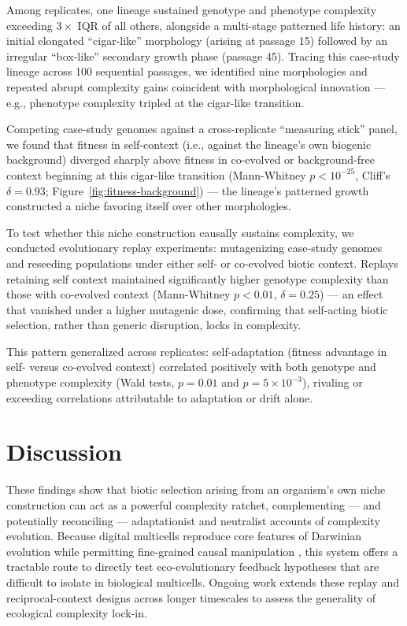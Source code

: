 Among replicates, one lineage sustained genotype and phenotype complexity exceeding $3\times$ IQR of all others, alongside a multi-stage patterned life history: an initial elongated ``cigar-like'' morphology (arising at passage 15) followed by an irregular ``box-like'' secondary growth phase (passage 45).
Tracing this case-study lineage across 100 sequential passages, we identified nine morphologies and repeated abrupt complexity gains coincident with morphological innovation --- e.g., phenotype complexity tripled at the cigar-like transition.



Competing case-study genomes against a cross-replicate ``measuring stick'' panel, we found that fitness in self-context (i.e., against the lineage's own biogenic background) diverged sharply above fitness in co-evolved or background-free context beginning at this cigar-like transition (Mann-Whitney $p<10^{-25}$, Cliff's $\delta=0.93$; Figure~\ref{fig:fitness-background}) --- the lineage's patterned growth constructed a niche favoring itself over other morphologies.

To test whether this niche construction causally sustains complexity, we conducted evolutionary replay experiments: mutagenizing case-study genomes and reseeding populations under either self- or co-evolved biotic context.
Replays retaining self context maintained significantly higher genotype complexity than those with co-evolved context (Mann-Whitney $p<0.01$, $\delta=0.25$) --- an effect that vanished under a higher mutagenic dose, confirming that self-acting biotic selection, rather than generic disruption, locks in complexity.

This pattern generalized across replicates: self-adaptation (fitness advantage in self- versus co-evolved context) correlated positively with both genotype and phenotype complexity (Wald tests, $p=0.01$ and $p=5\times10^{-3}$), rivaling or exceeding correlations attributable to adaptation or drift alone.

\section{Discussion}

These findings show that biotic selection arising from an organism's own niche construction can act as a powerful complexity ratchet, complementing --- and potentially reconciling --- adaptationist and neutralist accounts of complexity evolution.
Because digital multicells reproduce core features of Darwinian evolution while permitting fine-grained causal manipulation \citep{pennock2007models}, this system offers a tractable route to directly test eco-evolutionary feedback hypotheses that are difficult to isolate in biological multicells.
Ongoing work extends these replay and reciprocal-context designs across longer timescales to assess the generality of ecological complexity lock-in.
